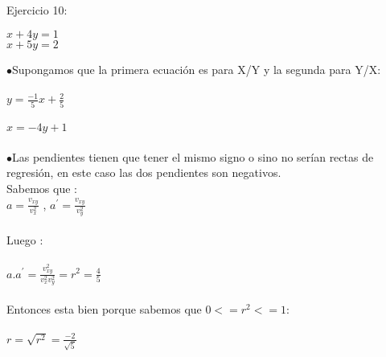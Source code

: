 \documentclass{article}
\begin{document}
	Ejercicio 10:
	
\begin{center}
	$x + 4y = 1 $\\
$x + 5y = 2$
\end{center}
	
	$\bullet$Supongamos que la primera ecuación es para X/Y y la segunda para Y/X:\\ \\
	$y = \frac{-1}{5}x + \frac{2}{5}$\\ \\
	$x = -4y + 1$\\ \\
	$\bullet$Las pendientes tienen que tener el mismo signo o sino no serían rectas de regresión, en este caso las dos pendientes son negativos.\\ 
	Sabemos que : \\
	
	
	$a = \frac{v_{xy}}{v_{x}^{2}} $ , $a^{'} = \frac{v_{xy}}{v_{y}^{2}} $\\ \\
	Luego :\\ \\
	$a.a^{'} = \frac{v_{xy}^{2}}{v_{x}^{2}v_{y}^{2}} = r^{2} = \frac{4}{5} $\\ \\
	Entonces esta bien porque sabemos que $ 0 <= r^{2} <= 1 $: \\ \\
	$r = \sqrt{ r^{2}}= \frac{-2}{\sqrt{5}} $
	
\end{document}
